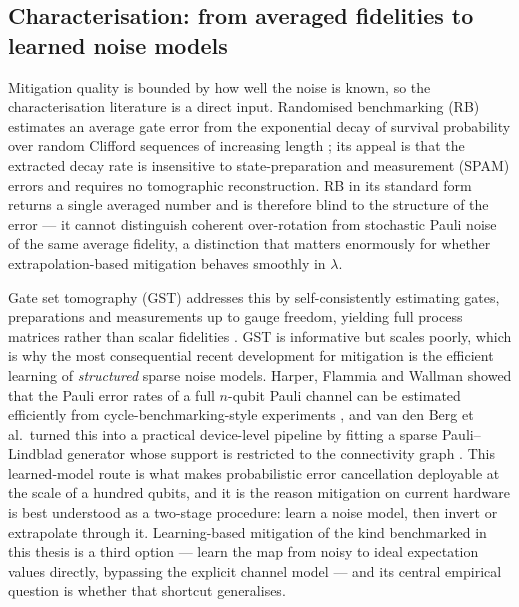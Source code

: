 \documentclass[Thesis.tex]{subfiles}
\begin{document}
\subsection{Characterisation: from averaged fidelities to learned noise models}

Mitigation quality is bounded by how well the noise is known, so the
characterisation literature is a direct input. Randomised benchmarking (RB)
estimates an average gate error from the exponential decay of survival
probability over random Clifford sequences of increasing length
\cite{knill2008randomized}; its appeal is that the extracted decay rate is
insensitive to state-preparation and measurement (SPAM) errors and requires no
tomographic reconstruction. RB in its standard form returns a single averaged
number and is therefore blind to the structure of the error --- it cannot
distinguish coherent over-rotation from stochastic Pauli noise of the same
average fidelity, a distinction that matters enormously for whether
extrapolation-based mitigation behaves smoothly in $\lambda$.

Gate set tomography (GST) addresses this by self-consistently estimating gates,
preparations and measurements up to gauge freedom, yielding full process
matrices rather than scalar fidelities \cite{nielsen2021gst}. GST is
informative but scales poorly, which is why the most consequential recent
development for mitigation is the efficient learning of \emph{structured}
sparse noise models. Harper, Flammia and Wallman showed that the Pauli error
rates of a full $n$-qubit Pauli channel can be estimated efficiently from
cycle-benchmarking-style experiments \cite{harper2020efficient}, and van den
Berg et al.\ turned this into a practical device-level pipeline by fitting a
sparse Pauli--Lindblad generator whose support is restricted to the
connectivity graph \cite{vandenberg2023probabilistic}. This learned-model route
is what makes probabilistic error cancellation deployable at the scale of a
hundred qubits, and it is the reason mitigation on current hardware is best
understood as a two-stage procedure: learn a noise model, then invert or
extrapolate through it. Learning-based mitigation of the kind benchmarked in
this thesis is a third option --- learn the map from noisy to ideal
expectation values directly, bypassing the explicit channel model --- and its
central empirical question is whether that shortcut generalises.
\end{document}
